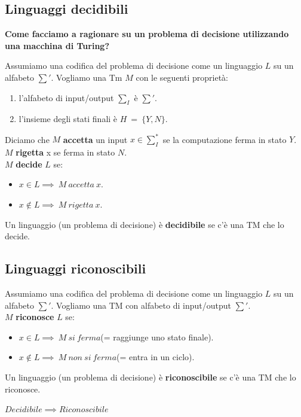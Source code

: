 \documentclass[a4paper, 12pt]{article}
\begin{document}
\subsection{Linguaggi decidibili}
\begin{center}
\textbf{Come facciamo a ragionare su un problema di decisione utilizzando una macchina di Turing?}
\end{center}
Assumiamo una codifica del problema di decisione come un linguaggio $L$ su un alfabeto $\sum'$. Vogliamo una Tm $M$ con le seguenti propriet\`a: \begin{enumerate}
\item l'alfabeto di input/output $\sum_{I}$ \`e $\sum'$.
\item l'insieme degli stati finali \`e $H\ =\ \{Y,N\}$.
\end{enumerate}
Diciamo che $M$ \textbf{accetta} un input $x \in \sum_{I}^{*}$ se la computazione ferma in stato $Y$. $M$ \textbf{rigetta} x se ferma in stato $N$.\\
$M$ \textbf{decide} $L$ se:
\begin{itemize}
\item $x \in L \implies\ M\ accetta\ x.$
\item $x \notin L \implies\ M\ rigetta\ x.$
\end{itemize}
Un linguaggio (un problema di decisione) \`e \textbf{decidibile} se c'\`e una TM che lo decide.
\subsection{Linguaggi riconoscibili}
Assumiamo una codifica del problema di decisione come un linguaggio $L$ su un alfabeto $\sum'$. Vogliamo una TM con alfabeto di input/output $\sum'$.\\
$M$ \textbf{riconosce} $L$ se:
\begin{itemize}
\item $x \in L \implies\ M\ si\ ferma$(= raggiunge uno stato finale).
\item $x \notin L \implies\ M\ non\ si\ ferma$(= entra in un ciclo).
\end{itemize}
Un linguaggio (un problema di decisione) \`e \textbf{riconoscibile} se c'\`e una TM che lo riconosce.\\
\begin{center}
$Decidibile \implies Riconoscibile$
\end{center}
\end{document}
